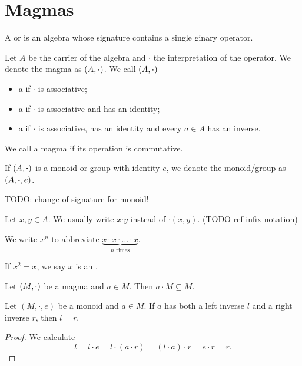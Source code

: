 \chapter{Magmas}
\begin{definition}
A  or  is an algebra whose signature contains a single ginary operator.

Let $A$ be the carrier of the algebra and $\boldsymbol{\cdot}$ the interpretation of the operator. We denote the magma as $\left( A,\boldsymbol{\cdot} \right)$. We call $\left( A,\boldsymbol{\cdot} \right)$
\begin{itemize}
\item a  if $\boldsymbol{\cdot}$ is associative;
\item a  if $\boldsymbol{\cdot}$ is associative and has an identity;
\item a  if $\boldsymbol{\cdot}$ is associative, has an identity and every $a\in A$ has an inverse.
\end{itemize}
We call a magma  if its operation is commutative.

If $\left( A,\boldsymbol{\cdot} \right)$ is a monoid or group with identity $e$, we denote the monoid/group as $\left( A,\boldsymbol{\cdot}, e \right)$.
\end{definition}
TODO: change of signature for monoid!

Let $x,y\in A$. We usually write $x\boldsymbol{\cdot} y$ instead of $\boldsymbol{\cdot}(x,y)$. (TODO ref infix notation)

\begin{definition}
We write $x^n$ to abbreviate $\underbrace{x\cdot x\cdot \ldots \cdot x}_{\text{$n$ times}}$.

If $x^2 = x$, we say $x$ is an .
\end{definition}

\begin{lemma}
Let $\left( M,\cdot \right)$ be a magma and $a\in M$. Then $a\cdot M \subseteq M$.
\end{lemma}

\begin{proposition} \label{leftRightInverseMonoid}
Let $(M,\cdot,e)$ be a monoid and $a\in M$. If $a$ has both a left inverse $l$ and a right inverse $r$, then $l=r$.
\end{proposition}
\begin{proof}
We calculate
\[ l = l\cdot e = l\cdot(a\cdot r) = (l\cdot a)\cdot r= e\cdot r = r. \]
\end{proof}

